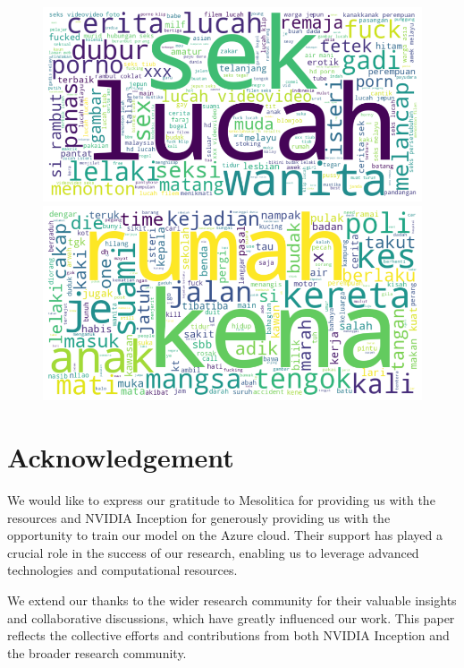 \documentclass[preprint]{article}
\begin{document}
\begin{figure}[h]
  \centering
  \begin{minipage}[b]{0.45\textwidth}
    \centering
    \includegraphics[width=\linewidth]{img/porn-wordcloud.png}
  \end{minipage}
  \hfill
  \begin{minipage}[b]{0.45\textwidth}
    \centering
    \includegraphics[width=\linewidth]{img/violence-wordcloud.png}
  \end{minipage}
\end{figure}

\section{Acknowledgement}

We would like to express our gratitude to Mesolitica for providing us with the resources and NVIDIA Inception for generously providing us with the opportunity to train our model on the Azure cloud. Their support has played a crucial role in the success of our research, enabling us to leverage advanced technologies and computational resources.

We extend our thanks to the wider research community for their valuable insights and collaborative discussions, which have greatly influenced our work. This paper reflects the collective efforts and contributions from both NVIDIA Inception and the broader research community.
\end{document}
